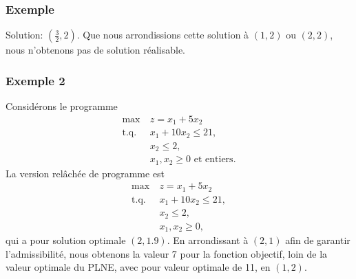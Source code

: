 \documentclass[usepdftitle=false]{beamer}
\def\st{\mbox{t.q. }}
\begin{document}
\begin{frame}
\frametitle{Exemple}

Solution: $\left( \frac{3}{2},2\right)$. Que nous arrondissions cette solution à $(1,2)$ ou $(2,2)$, nous n'obtenons pas de solution réalisable.
\begin{center}
\end{center}

\end{frame}

\begin{frame}
\frametitle{Exemple 2}

Considérons le programme
\begin{align*}
\max\ & z = x_1+5x_2\\
\st & x_1+10x_2 \leq 21, \\
& x_2 \leq 2, \\
& x_1, x_2 \geq 0 \mbox{ et entiers}.
\end{align*}
La version relâchée de programme est
\begin{align*}
\max\ & z = x_1+5x_2\\
\st & x_1+10x_2 \leq 21, \\
& x_2 \leq 2, \\
& x_1, x_2 \geq 0,
\end{align*}
qui a pour solution optimale $(2, 1.9)$. En arrondissant à $(2,1)$ afin de garantir l'admissibilité, nous obtenons la valeur 7 pour la fonction objectif, loin de la valeur optimale du PLNE, avec pour valeur optimale de 11, en $(1,2)$.

\end{frame}
\end{document}
